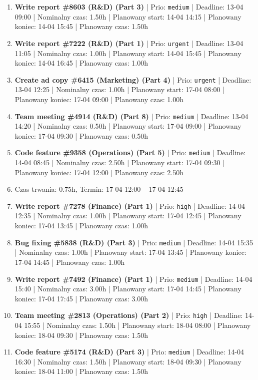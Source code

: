 {\begin{enumerate}
  \item [\textbf{14634}] \textbf{Write report \#8603 (R\&D) (Part 3)} | Prio: \texttt{medium} | Deadline: 13-04 09:00 | Nominalny czas: 1.50h | Planowany start: 14-04 14:15 | Planowany koniec: 14-04 15:45 | Planowany czas: 1.50h
  \item [\textbf{14601}] \textbf{Write report \#7222 (R\&D) (Part 1)} | Prio: \texttt{urgent} | Deadline: 13-04 11:05 | Nominalny czas: 1.00h | Planowany start: 14-04 15:45 | Planowany koniec: 14-04 16:45 | Planowany czas: 1.00h
  \item [\textbf{14602}] \textbf{Create ad copy \#6415 (Marketing) (Part 4)} | Prio: \texttt{urgent} | Deadline: 13-04 12:25 | Nominalny czas: 1.00h | Planowany start: 17-04 08:00 | Planowany koniec: 17-04 09:00 | Planowany czas: 1.00h
  \item [\textbf{14638}] \textbf{Team meeting \#4914 (R\&D) (Part 8)} | Prio: \texttt{medium} | Deadline: 13-04 14:20 | Nominalny czas: 0.50h | Planowany start: 17-04 09:00 | Planowany koniec: 17-04 09:30 | Planowany czas: 0.50h
  \item [\textbf{14661}] \textbf{Code feature \#9358 (Operations) (Part 5)} | Prio: \texttt{medium} | Deadline: 14-04 08:45 | Nominalny czas: 2.50h | Planowany start: 17-04 09:30 | Planowany koniec: 17-04 12:00 | Planowany czas: 2.50h
  \item [\textbf{PRZERWA}] Czas trwania: 0.75h, Termin: 17-04 12:00 -- 17-04 12:45
  \item [\textbf{14609}] \textbf{Write report \#7278 (Finance) (Part 1)} | Prio: \texttt{high} | Deadline: 14-04 12:35 | Nominalny czas: 1.00h | Planowany start: 17-04 12:45 | Planowany koniec: 17-04 13:45 | Planowany czas: 1.00h
  \item [\textbf{14637}] \textbf{Bug fixing \#5838 (R\&D) (Part 3)} | Prio: \texttt{medium} | Deadline: 14-04 15:35 | Nominalny czas: 1.00h | Planowany start: 17-04 13:45 | Planowany koniec: 17-04 14:45 | Planowany czas: 1.00h
  \item [\textbf{14642}] \textbf{Write report \#7492 (Finance) (Part 1)} | Prio: \texttt{medium} | Deadline: 14-04 15:40 | Nominalny czas: 3.00h | Planowany start: 17-04 14:45 | Planowany koniec: 17-04 17:45 | Planowany czas: 3.00h
  \item [\textbf{14617}] \textbf{Team meeting \#2813 (Operations) (Part 2)} | Prio: \texttt{high} | Deadline: 14-04 15:55 | Nominalny czas: 1.50h | Planowany start: 18-04 08:00 | Planowany koniec: 18-04 09:30 | Planowany czas: 1.50h
  \item [\textbf{14646}] \textbf{Code feature \#5174 (R\&D) (Part 3)} | Prio: \texttt{medium} | Deadline: 14-04 16:30 | Nominalny czas: 1.50h | Planowany start: 18-04 09:30 | Planowany koniec: 18-04 11:00 | Planowany czas: 1.50h

\end{enumerate}}
